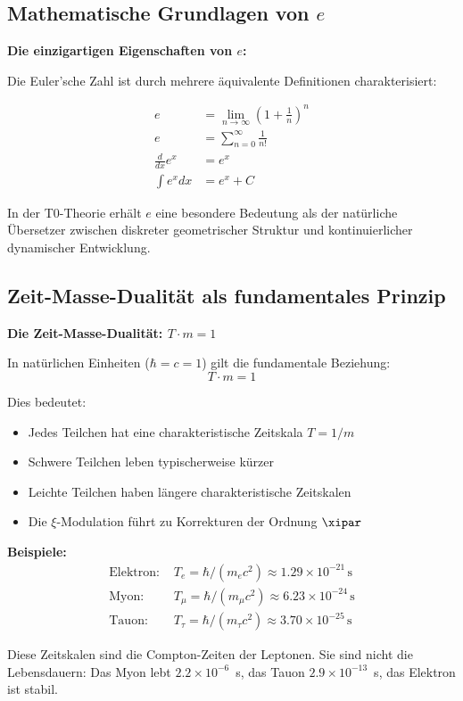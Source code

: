 	\subsection{Mathematische Grundlagen von $e$}
	
	\begin{beziehung}
		\textbf{Die einzigartigen Eigenschaften von $e$:}
		
		Die Euler'sche Zahl ist durch mehrere äquivalente Definitionen charakterisiert:
		
		\begin{align}
			e &= \lim_{n \to \infty} \left(1 + \frac{1}{n}\right)^n \\
			e &= \sum_{n=0}^{\infty} \frac{1}{n!} \\
			\frac{d}{dx}e^x &= e^x \\
			\int e^x dx &= e^x + C
		\end{align}
		
		In der T0-Theorie erhält $e$ eine besondere Bedeutung als der natürliche Übersetzer zwischen diskreter geometrischer Struktur und kontinuierlicher dynamischer Entwicklung.
	\end{beziehung}
	
	\subsection{Zeit-Masse-Dualität als fundamentales Prinzip}
	
	\begin{erkenntnis}
		\textbf{Die Zeit-Masse-Dualität: $T \cdot m = 1$}
		
		In natürlichen Einheiten ($\hbar = c = 1$) gilt die fundamentale Beziehung:
		\begin{equation}
			\boxed{T \cdot m = 1}
		\end{equation}
		
		Dies bedeutet:
		\begin{itemize}
			\item Jedes Teilchen hat eine charakteristische Zeitskala $T = 1/m$
			\item Schwere Teilchen leben typischerweise kürzer
			\item Leichte Teilchen haben längere charakteristische Zeitskalen
			\item Die $\xi$-Modulation führt zu Korrekturen der Ordnung $\xipar$
		\end{itemize}
		
		\textbf{Beispiele:}
		\begin{align}
			\text{Elektron: } & T_e = \hbar/(m_e c^2) \approx 1.29 \times 10^{-21}\, \text{s} \\
			\text{Myon: } & T_\mu = \hbar/(m_\mu c^2) \approx 6.23 \times 10^{-24}\, \text{s} \\
			\text{Tauon: } & T_\tau = \hbar/(m_\tau c^2) \approx 3.70 \times 10^{-25}\, \text{s}
		\end{align}
		
		Diese Zeitskalen sind die Compton-Zeiten der Leptonen. Sie sind nicht die Lebensdauern: Das Myon lebt $2.2 \times 10^{-6}$~s, das Tauon $2.9 \times 10^{-13}$~s, das Elektron ist stabil.
		
	\end{erkenntnis}
	
